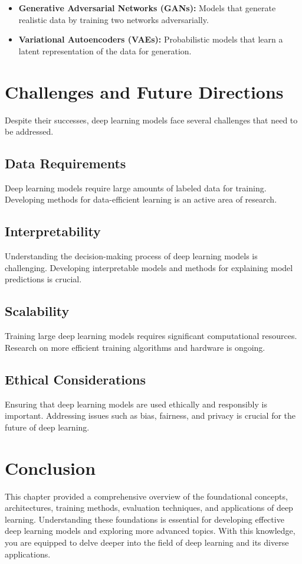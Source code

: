 \begin{itemize}
    \item \textbf{Generative Adversarial Networks (GANs):} Models that generate realistic data by training two networks adversarially.
    \item \textbf{Variational Autoencoders (VAEs):} Probabilistic models that learn a latent representation of the data for generation.
\end{itemize}

\section{Challenges and Future Directions}
Despite their successes, deep learning models face several challenges that need to be addressed.

\subsection{Data Requirements}
Deep learning models require large amounts of labeled data for training. Developing methods for data-efficient learning is an active area of research.

\subsection{Interpretability}
Understanding the decision-making process of deep learning models is challenging. Developing interpretable models and methods for explaining model predictions is crucial.

\subsection{Scalability}
Training large deep learning models requires significant computational resources. Research on more efficient training algorithms and hardware is ongoing.

\subsection{Ethical Considerations}
Ensuring that deep learning models are used ethically and responsibly is important. Addressing issues such as bias, fairness, and privacy is crucial for the future of deep learning.

\section{Conclusion}
This chapter provided a comprehensive overview of the foundational concepts, architectures, training methods, evaluation techniques, and applications of deep learning. Understanding these foundations is essential for developing effective deep learning models and exploring more advanced topics. With this knowledge, you are equipped to delve deeper into the field of deep learning and its diverse applications.


